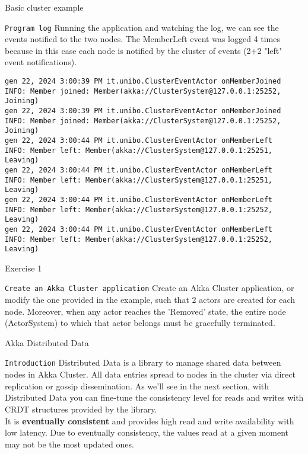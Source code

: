 \documentclass[presentation,apice]{beamer}\mode<presentation>{\usetheme{AMSBolognaFC}}
\begin{document}
\begin{frame}[c,fragile]{Basic cluster example}

\begin{block}{\texttt{Program log}}
Running the application and watching the log, we can see the events notified to the two nodes.
The MemberLeft event was logged 4 times because in this case each node is notified by the cluster of events (2+2 "left" event notifications). 
\begin{lstlisting}
gen 22, 2024 3:00:39 PM it.unibo.ClusterEventActor onMemberJoined
INFO: Member joined: Member(akka://ClusterSystem@127.0.0.1:25252, Joining)
gen 22, 2024 3:00:39 PM it.unibo.ClusterEventActor onMemberJoined
INFO: Member joined: Member(akka://ClusterSystem@127.0.0.1:25252, Joining)
gen 22, 2024 3:00:44 PM it.unibo.ClusterEventActor onMemberLeft
INFO: Member left: Member(akka://ClusterSystem@127.0.0.1:25251, Leaving)
gen 22, 2024 3:00:44 PM it.unibo.ClusterEventActor onMemberLeft
INFO: Member left: Member(akka://ClusterSystem@127.0.0.1:25251, Leaving)
gen 22, 2024 3:00:44 PM it.unibo.ClusterEventActor onMemberLeft
INFO: Member left: Member(akka://ClusterSystem@127.0.0.1:25252, Leaving)
gen 22, 2024 3:00:44 PM it.unibo.ClusterEventActor onMemberLeft
INFO: Member left: Member(akka://ClusterSystem@127.0.0.1:25252, Leaving)
\end{lstlisting}

\end{block}
%
\end{frame}
\begin{frame}[c,fragile]{Exercise 1}

\begin{block}{\texttt{Create an Akka Cluster application}}
Create an Akka Cluster application, or modify the one provided in the example, such that 2 actors are created for each node. Moreover, when any actor reaches the 'Removed' state, the entire node (ActorSystem) to which that actor belongs must be gracefully terminated.
\end{block}
%
\end{frame}

\begin{frame}[c,fragile]{Akka Distributed Data}

\begin{block}{\texttt{Introduction}}
Distributed Data is a library to manage shared data between nodes in Akka Cluster.
All data entries spread to nodes in the cluster via direct replication or gossip dissemination. 
As we'll see in the next section, with Distributed Data you can fine-tune the consistency level for reads and writes with CRDT structures provided by the library. \\
It is \textbf{eventually consistent} and provides high read and write availability with low latency. Due to eventually consistency, the values read at a given moment may not be the most updated ones.
\end{block}
%
\end{frame}
\end{document}
